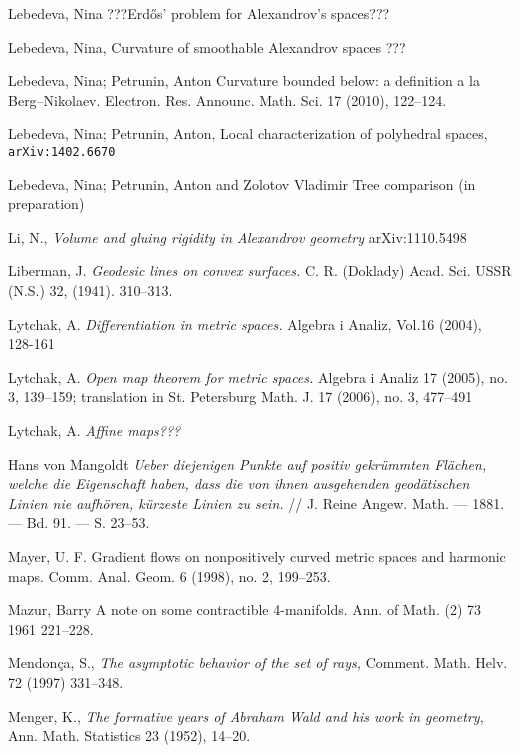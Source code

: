 \begin{thebibliography}{52}
 Lebedeva, Nina ???Erd\H{o}s' problem for Alexandrov's spaces???

 Lebedeva, Nina, Curvature of smoothable Alexandrov spaces ??? 

 Lebedeva, Nina; Petrunin, Anton 
Curvature bounded below: a definition a la Berg--Nikolaev. 
Electron. Res. Announc. Math. Sci. 17 (2010), 122--124.

 Lebedeva, Nina; Petrunin, Anton, 
Local characterization of polyhedral spaces,
{\tt arXiv:1402.6670}

 Lebedeva, Nina; Petrunin, Anton and Zolotov Vladimir
Tree comparison (in preparation)

Li, N.,
\textit{Volume and gluing rigidity in Alexandrov geometry}
arXiv:1110.5498

Liberman, J. \textit{Geodesic lines on convex surfaces.}  C. R.
(Doklady) Acad. Sci. USSR (N.S.)  32,  (1941). 310--313.

Lytchak, A. \textit{Differentiation in metric spaces.}  Algebra i Analiz, Vol.16 (2004), 128-161 

Lytchak, A. \textit{Open map theorem for metric spaces.}  Algebra i Analiz  17  (2005),  no. 3, 139--159;  translation in  St. Petersburg Math. J.  17  (2006),  no. 3, 477--491 

 Lytchak, A. \textit{Affine maps???}

 Hans von Mangoldt 
\textit{Ueber diejenigen Punkte auf positiv gekr\"ummten Fl\"achen, welche die Eigenschaft haben, dass die von ihnen ausgehenden geod\"atischen Linien nie aufh\"oren, k\"urzeste Linien zu sein.} // J. Reine Angew. Math. --- 1881. --- Bd. 91. --- S. 23--53.

 Mayer, U. F. Gradient flows on nonpositively curved metric spaces and harmonic maps. Comm. Anal. Geom. 6 (1998), no. 2, 199--253.

Mazur, Barry A note on some contractible 4-manifolds. Ann. of Math. (2) 73 1961 221--228. 

Mendon\c{c}a, S., \textit{The asymptotic behavior of the set of rays,} Comment. Math. Helv. 72 (1997) 331--348.


 Menger, K., \textit{The formative years of Abraham Wald and his work in geometry}, Ann. Math. Statistics 23 (1952), 14--20.



\end{thebibliography}
